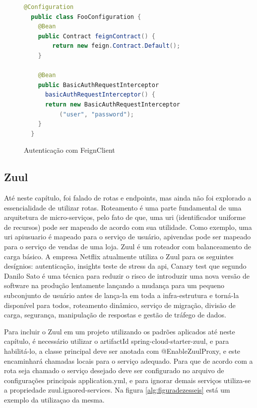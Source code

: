 \documentclass[journal]{IEEEtran}
\begin{document}
\begin{figure}[h]
\centering

\begin{lstlisting}[language=Java]
  @Configuration
  public class FooConfiguration {
    @Bean
    public Contract feignContract() {
        return new feign.Contract.Default();
    }

    @Bean
    public BasicAuthRequestInterceptor 
      basicAuthRequestInterceptor() {
      return new BasicAuthRequestInterceptor
          ("user", "password");
    }
  }
\end{lstlisting}

\caption{Autenticação com FeignClient}
\label{alg:figuraquinze}
\end{figure}

\subsection{Zuul}

Até neste capítulo, foi falado de rotas e endpoints, mas ainda não foi explorado a essencialidade de utilizar rotas. Roteamento é uma parte fundamental de uma arquitetura de micro-serviços, pelo fato de que, uma uri (identificador uniforme de recursos) pode ser mapeado de acordo com sua utilidade. Como exemplo, uma uri \/api\/usuario é mapeado para o serviço de usuário, \/api\/vendas pode ser mapeado para o serviço de vendas de uma loja. Zuul é um roteador com balanceamento de carga básico. A empresa Netflix atualmente utiliza o Zuul para os seguintes desígnios: autenticação, insights teste de stress da api, Canary test que segundo Danilo Sato \cite{danilosato2017} é uma técnica para reduzir o risco de introduzir uma nova versão de software na produção lentamente lançando a mudança para um pequeno subconjunto de usuário antes de lança-la em toda a infra-estrutura e torná-la disponível para todos, roteamento dinâmico, serviço de migração, divisão de carga, segurança, manipulação de respostas e gestão de tráfego de dados.

Para incluir o Zuul em um projeto utilizando os padrões aplicados até neste capítulo, é necessário utilizar o artifactId spring-cloud-starter-zuul, e para habilitá-lo, a classe principal deve ser anotada com @EnableZuulProxy, e este encaminhará chamadas locais para o serviço adequado. Para que de acordo com a rota seja chamado o serviço desejado deve ser configurado no arquivo de configurações principais application.yml, e para ignorar demais serviços utiliza-se a propriedade zuul.ignored-services. Na figura \ref{alg:figuradezesseis} está um exemplo da utilizaçao da mesma.
\end{document}
